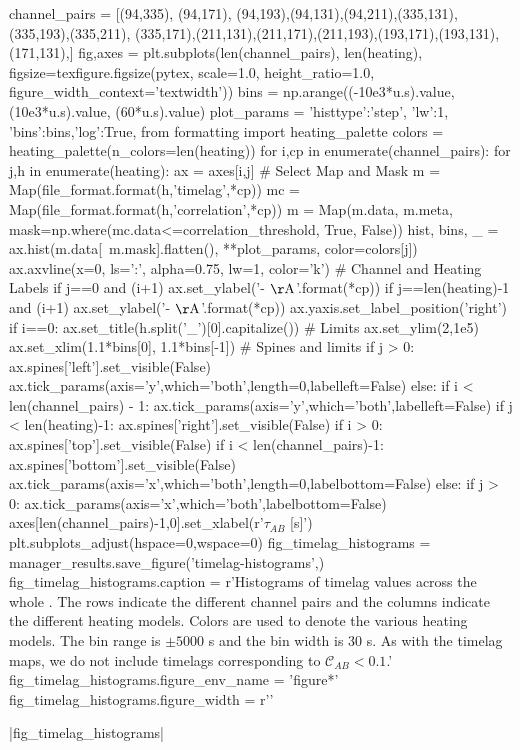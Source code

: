 \begin{pycode}
channel_pairs = [(94,335), (94,171), (94,193),(94,131),(94,211),(335,131),(335,193),(335,211),
                 (335,171),(211,131),(211,171),(211,193),(193,171),(193,131),(171,131),]
fig,axes = plt.subplots(len(channel_pairs), len(heating),
                        figsize=texfigure.figsize(pytex, scale=1.0, height_ratio=1.0,       
                                                  figure_width_context='textwidth'))
bins = np.arange((-10e3*u.s).value, (10e3*u.s).value, (60*u.s).value)
plot_params = {'histtype':'step', 'lw':1, 'bins':bins,'log':True,}
from formatting import heating_palette
colors = heating_palette(n_colors=len(heating))
for i,cp in enumerate(channel_pairs):
    for j,h in enumerate(heating):
        ax = axes[i,j]
        # Select Map and Mask
        m = Map(file_format.format(h,'timelag',*cp))
        mc = Map(file_format.format(h,'correlation',*cp))
        m = Map(m.data, m.meta, mask=np.where(mc.data<=correlation_threshold, True, False))
        hist, bins, _ = ax.hist(m.data[~m.mask].flatten(), **plot_params, color=colors[j])
        ax.axvline(x=0, ls=':', alpha=0.75, lw=1, color='k')
        # Channel and Heating Labels
        if j==0 and (i+1)%
            ax.set_ylabel('{}-{} $\mathrm{{\AA}}$'.format(*cp))
        if j==len(heating)-1 and (i+1)%
            ax.set_ylabel('{}-{} $\mathrm{{\AA}}$'.format(*cp))
            ax.yaxis.set_label_position('right')
        if i==0:
            ax.set_title(h.split('_')[0].capitalize())
        # Limits
        ax.set_ylim(2,1e5)
        ax.set_xlim(1.1*bins[0], 1.1*bins[-1])
        # Spines and limits
        if j > 0:
            ax.spines['left'].set_visible(False)
            ax.tick_params(axis='y',which='both',length=0,labelleft=False)
        else:
            if i < len(channel_pairs) - 1:
                ax.tick_params(axis='y',which='both',labelleft=False)
        if j < len(heating)-1:
            ax.spines['right'].set_visible(False)
        if i > 0:
            ax.spines['top'].set_visible(False)
        if i < len(channel_pairs)-1:
            ax.spines['bottom'].set_visible(False)
            ax.tick_params(axis='x',which='both',length=0,labelbottom=False)
        else:
            if j > 0:
                ax.tick_params(axis='x',which='both',labelbottom=False)
axes[len(channel_pairs)-1,0].set_xlabel(r'$\tau_{AB}$ [s]')
plt.subplots_adjust(hspace=0,wspace=0)
fig_timelag_histograms = manager_results.save_figure('timelag-histograms',)
fig_timelag_histograms.caption = r'Histograms of timelag values across the whole \AR{}. The rows indicate the different channel pairs and the columns indicate the different heating models. Colors are used to denote the various heating models. The bin range is $\pm5000$ s and the bin width is 30 s. As with the timelag maps, we do not include timelags corresponding to $\mathcal{C}_{AB}<0.1$.'
fig_timelag_histograms.figure_env_name = 'figure*'
fig_timelag_histograms.figure_width = r'\textwidth'
\end{pycode}
|fig_timelag_histograms|

